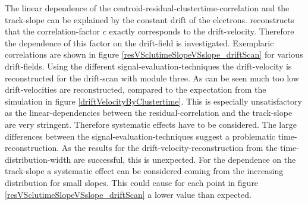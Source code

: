 \documentclass[
twoside,            %
BCOR1.4cm,          %
10pt,               %
headings=normal,    %
headsepline,        %
clearplainpage,		%
final,              %
div=14,
open=right,
bibliography=toc
]{scrreprt}
\begin{document}


The linear dependence of the centroid-residual-clustertime-correlation and the track-slope can be explained by the constant drift of the electrons.
\cite{flierlThesis} reconstructs that the correlation-factor $c$ exactly corresponds to the drift-velocity.
Therefore the dependence of this factor on the drift-field is investigated.
Exemplaric correlations are shown in figure \ref{resVSclutimeSlopeVSslope_driftScan} for various drift-fields.
Using the different signal-evaluation-techniques the drift-velocity is reconstructed for the drift-scan with module three.
As can be seen much too low drift-velocities are reconstructed, compared to the expectation from the simulation in figure \ref{driftVelocityByClustertime}.
This is especially unsatisfactory as the linear-dependencies between the residual-correlation and the track-slope are very stringent.
Therefore systematic effects have to be considered.
The large differences between the signal-evaluation-techniques suggest a problematic time-reconstruction.
As the results for the drift-velocity-reconstruction from the time-distribution-width are successful, this is unexpected.
For the dependence on the track-slope a systematic effect can be considered coming from the increasing distribution for small slopes.
This could cause for each point in figure \ref{resVSclutimeSlopeVSslope_driftScan} a lower value than expected.
\end{document}
